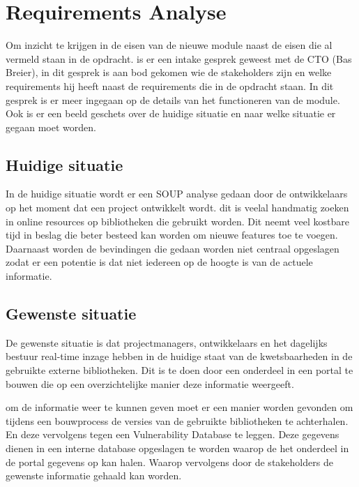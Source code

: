
\chapter{Requirements Analyse} %

\label{requirementsAnalyse} %
Om inzicht te krijgen in de eisen van de nieuwe module naast de eisen die al vermeld staan in de opdracht. is er een intake gesprek geweest met de CTO (Bas Breier), in dit gesprek is aan bod gekomen wie de stakeholders zijn en welke requirements hij heeft naast de requirements die in de opdracht staan. In dit gesprek is er meer ingegaan op de details van het functioneren van de module. Ook is er een beeld geschets over de huidige situatie en naar welke situatie er gegaan moet worden. %


\section{Huidige situatie}
In de huidige situatie wordt er een SOUP analyse gedaan door de ontwikkelaars op het moment dat een project ontwikkelt wordt. dit is veelal handmatig zoeken in online resources op bibliotheken die gebruikt worden. Dit neemt veel kostbare tijd in beslag die beter besteed kan worden om nieuwe features toe te voegen. Daarnaast worden de bevindingen die gedaan worden niet centraal opgeslagen zodat er een potentie is dat niet iedereen op de hoogte is van de actuele informatie.

\section{Gewenste situatie}
De gewenste situatie is dat projectmanagers, ontwikkelaars en het dagelijks bestuur real-time inzage hebben in de huidige staat van de kwetsbaarheden in de gebruikte externe bibliotheken. Dit is te doen door een onderdeel in een portal te bouwen die op een overzichtelijke manier deze informatie weergeeft.

om de informatie weer te kunnen geven moet er een manier worden gevonden om tijdens een bouwprocess de versies van de gebruikte bibliotheken te achterhalen. En deze vervolgens tegen een Vulnerability Database te leggen. Deze gegevens dienen in een interne database opgeslagen te worden waarop de het onderdeel in de portal gegevens op kan halen. Waarop vervolgens door de stakeholders de gewenste informatie gehaald kan worden.
 
